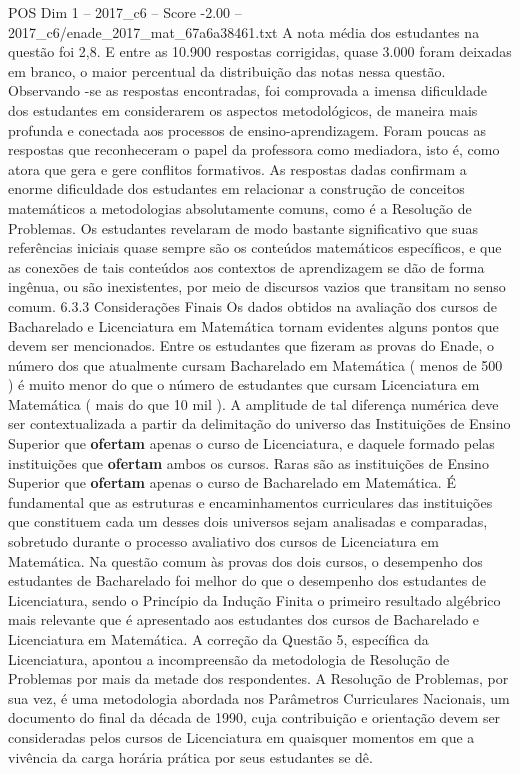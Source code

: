 \begin{textsample}{POS Dim 1 – 2017\_c6 – Score -2.00 – 2017\_c6/enade\_2017\_mat\_67a6a38461.txt}
A nota média dos estudantes na questão foi 2,8.
E entre as 10.900 respostas corrigidas, quase 3.000 foram deixadas em branco, o maior percentual da distribuição das notas nessa questão.
Observando -se as respostas encontradas, foi comprovada a imensa dificuldade dos estudantes em considerarem os aspectos metodológicos, de maneira mais profunda e conectada aos processos de ensino-aprendizagem.
Foram poucas as respostas que reconheceram o papel da professora como mediadora, isto é, como atora que gera e gere conflitos formativos.
As respostas dadas confirmam a enorme dificuldade dos estudantes em relacionar a construção de conceitos matemáticos a metodologias absolutamente comuns, como é a Resolução de Problemas.
Os estudantes revelaram de modo bastante significativo que suas referências iniciais quase sempre são os conteúdos matemáticos específicos, e que as conexões de tais conteúdos aos contextos de aprendizagem se dão de forma ingênua, ou são inexistentes, por meio de discursos vazios que transitam no senso comum. 6.3.3 Considerações Finais Os dados obtidos na avaliação dos cursos de Bacharelado e Licenciatura em Matemática tornam evidentes alguns pontos que devem ser mencionados.
Entre os estudantes que fizeram as provas do Enade, o número dos que atualmente cursam Bacharelado em Matemática ( menos de 500 ) é muito menor do que o número de estudantes que cursam Licenciatura em Matemática ( mais do que 10 mil ).
A amplitude de tal diferença numérica deve ser contextualizada a partir da delimitação do universo das Instituições de Ensino Superior que \textbf{ofertam} apenas o curso de Licenciatura, e daquele formado pelas instituições que \textbf{ofertam} ambos os cursos.
Raras são as instituições de Ensino Superior que \textbf{ofertam} apenas o curso de Bacharelado em Matemática.
É fundamental que as estruturas e encaminhamentos curriculares das instituições que constituem cada um desses dois universos sejam analisadas e comparadas, sobretudo durante o processo avaliativo dos cursos de Licenciatura em Matemática.
Na questão comum às provas dos dois cursos, o desempenho dos estudantes de Bacharelado foi melhor do que o desempenho dos estudantes de Licenciatura, sendo o Princípio da Indução Finita o primeiro resultado algébrico mais relevante que é apresentado aos estudantes dos cursos de Bacharelado e Licenciatura em Matemática.
A correção da Questão 5, específica da Licenciatura, apontou a incompreensão da metodologia de Resolução de Problemas por mais da metade dos respondentes.
A Resolução de Problemas, por sua vez, é uma metodologia abordada nos Parâmetros Curriculares Nacionais, um documento do final da década de 1990, cuja contribuição e orientação devem ser consideradas pelos cursos de Licenciatura em quaisquer momentos em que a vivência da carga horária prática por seus estudantes se dê.

\end{textsample}
